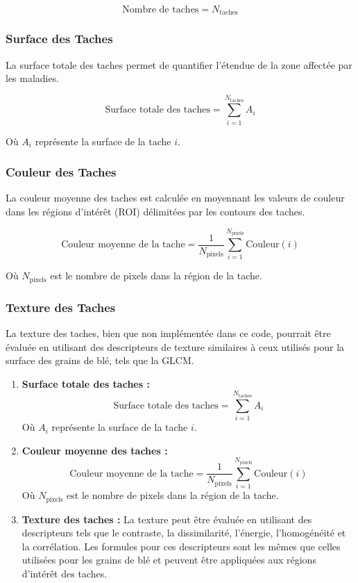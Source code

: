 \[
\text{Nombre de taches} = N_{\text{taches}}
\]

\subsubsection*{Surface des Taches}
La surface totale des taches permet de quantifier l'étendue de la zone affectée par les maladies.

\[
\text{Surface totale des taches} = \sum_{i=1}^{N_{\text{taches}}} A_i
\]

Où \( A_i \) représente la surface de la tache \( i \).

\subsubsection*{Couleur des Taches}
La couleur moyenne des taches est calculée en moyennant les valeurs de couleur dans les régions d'intérêt (ROI) délimitées par les contours des taches.

\[
\text{Couleur moyenne de la tache} = \frac{1}{N_{\text{pixels}}} \sum_{i=1}^{N_{\text{pixels}}} \text{Couleur}(i)
\]

Où \( N_{\text{pixels}} \) est le nombre de pixels dans la région de la tache.

\subsubsection*{Texture des Taches}
La texture des taches, bien que non implémentée dans ce code, pourrait être évaluée en utilisant des descripteurs de texture similaires à ceux utilisés pour la surface des grains de blé, tels que la GLCM.


\begin{enumerate}
	\item \textbf{Surface totale des taches :}
	\[
	\text{Surface totale des taches} = \sum_{i=1}^{N_{\text{taches}}} A_i
	\]
	Où \( A_i \) représente la surface de la tache \( i \).
	
	\item \textbf{Couleur moyenne des taches :}
	\[
	\text{Couleur moyenne de la tache} = \frac{1}{N_{\text{pixels}}} \sum_{i=1}^{N_{\text{pixels}}} \text{Couleur}(i)
	\]
	Où \( N_{\text{pixels}} \) est le nombre de pixels dans la région de la tache.
	
	\item \textbf{Texture des taches :}
	La texture peut être évaluée en utilisant des descripteurs tels que le contraste, la dissimilarité, l'énergie, l'homogénéité et la corrélation. Les formules pour ces descripteurs sont les mêmes que celles utilisées pour les grains de blé et peuvent être appliquées aux régions d'intérêt des taches.
\end{enumerate}


